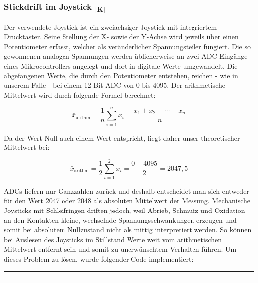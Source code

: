 \documentclass[a4paper,12pt]{article}
\begin{document}
\subsubsection{\texorpdfstring{Stickdrift im Joystick \textsubscript{[K]}}{Stickdrift im Joystick [K]}}

Der verwendete Joystick ist ein zweiachsiger Joystick mit integriertem Drucktaster. Seine Stellung der X‑ sowie der Y‑Achse wird jeweils über einen Potentiometer erfasst, welcher als veränderlicher Spannungsteiler fungiert. Die so gewonnenen analogen Spannungen werden üblicherweise an zwei ADC‑Eingänge eines Mikrocontrollers angelegt und dort in digitale Werte umgewandelt. Die abgefangenen Werte, die durch den Potentiometer entstehen, reichen - wie in unserem Falle - bei einem 12-Bit ADC von 0 bis 4095. Der arithmetische Mittelwert wird durch folgende Formel berechnet: 

\begin{equation}
    \bar{x}_{\text{arithm}} = \frac{1}{n} \sum_{i=1}^{n} x_i = \frac{x_1 + x_2 + \cdots + x_n}{n}
    \label{eq:arithmetic_mean}
\end{equation}

Da der Wert Null auch einem Wert entspricht, liegt daher unser theoretischer Mittelwert bei: 

\begin{equation}
    \bar{x}_{\text{arithm}} = \frac{1}{2} \sum_{i=1}^{2} x_i = \frac{0 + 4095}{2} = 2047,5
    \label{eq:arithmetic_mean_2}
\end{equation}

ADCs liefern nur Ganzzahlen zurück und deshalb entscheidet man sich entweder für den Wert 2047 oder 2048 als absoluten Mittelwert der Messung. Mechanische Joysticks mit Schleifringen driften jedoch, weil Abrieb, Schmutz und Oxidation an den Kontakten kleine, wechselnde Spannungsschwankungen erzeugen und somit bei absolutem Nullzustand nicht als mittig interpretiert werden. So können bei Auslesen des Joysticks im Stillstand Werte weit vom arithmetischen Mittelwert entfernt sein und somit zu unerwünschtem Verhalten führen. Um dieses Problem zu lösen, wurde folgender Code implementiert: \newline

\noindent\rule{\linewidth}{0.4pt}  %

\noindent\rule{\linewidth}{0.4pt}\\[0.5em]  %
\end{document}
